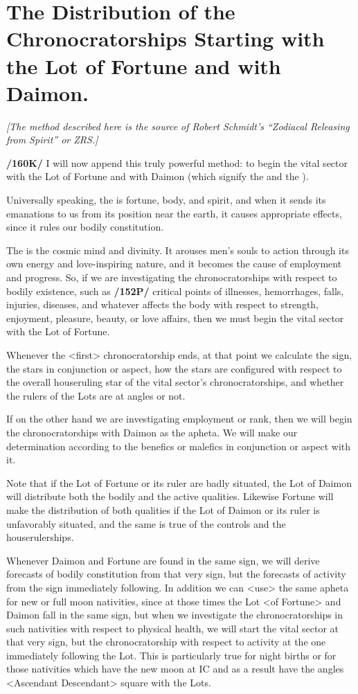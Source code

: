 \section{The Distribution of the Chronocratorships Starting with the Lot of Fortune and with Daimon.}

\textsl{[The method described here is the source of Robert Schmidt's ``Zodiacal Releasing from Spirit'' or ZRS.]}

\textbf{/160K/} I will now append this truly powerful method: to begin the vital sector with the Lot of Fortune and with Daimon (which signify the \Moon\xspace and the \Sun).

Universally speaking, the \Moon\xspace is fortune, body, and
spirit, and when it sends its emanations to us from its position near the earth, it causes appropriate effects, since it rules our bodily constitution. 

The \Sun\xspace is the cosmic mind and divinity. It arouses men’s souls to action through its own energy and love-inspiring nature, and it becomes the cause of employment and progress.
So, if we are investigating the chronocratorships with respect to bodily existence, such as \textbf{/152P/} critical points of illnesses, hemorrhages, falls, injuries, diseases, and whatever affects the body with respect to strength, enjoyment, pleasure, beauty, or love affairs, then we must begin the vital sector with the Lot of Fortune. 

Whenever the <first> chronocratorship ends, at that point we calculate the sign, the stars in conjunction or aspect, how the stars are configured with respect to the overall houseruling star of the vital sector’s chronocratorships, and whether the rulers of the Lots are at angles or not.

If on the other hand we are investigating employment or rank, then we will begin the chronocratorships with Daimon as the apheta. We will make our determination according to the benefics or malefics in conjunction or aspect with it.

Note that if the Lot of Fortune or its ruler are badly situated, the Lot of Daimon will distribute both the bodily and the active qualities. Likewise Fortune will make the distribution of both qualities if the Lot of Daimon or its ruler is unfavorably situated, and the same is true of the controls and the houserulerships.

Whenever Daimon and Fortune are found in the same sign, we will derive forecasts of bodily constitution from that very sign, but the forecasts of activity from the sign immediately following. In addition we can <use> the same apheta for new or full moon nativities, since at those times the Lot <of
Fortune> and Daimon fall in the same sign, but when we investigate the chronocratorships in such nativities with respect to physical health, we will start the vital sector at that very sign, but the chronocratorship with respect to activity at the one immediately following the Lot. This is particularly true for night births or for those nativities which have the new moon at IC and as a result have the angles
<Ascendant Descendant> square with the Lots. 

